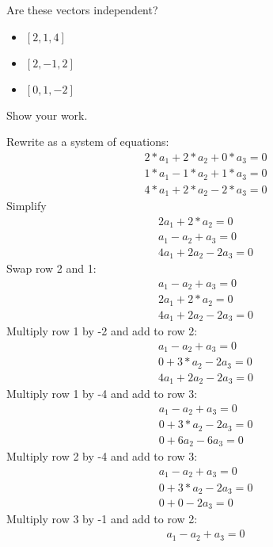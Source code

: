 \begin{Exercise}[title={Vector Independence}, label=vector_independence]
    Are these vectors independent? 
    \begin{itemize}
    	\item $[2, 1, 4]$
    	\item $[2, -1, 2]$ 
    	\item $[0, 1, -2]$
    \end{itemize}
    Show your work.
\end{Exercise}
\begin{Answer}[ref=vector_independence]
    Rewrite as a system of equations:
        $$\begin{matrix}
			2*a_1 +2*a_2 + 0*a_3 = 0 \\
			1*a_1 - 1*a_2 +1*a_3 = 0 \\
			4*a_1 + 2*a_2 - 2*a_3 = 0
		  \end{matrix} $$
	Simplify
		$$\begin{matrix}
			2a_1 +2*a_2  = 0 \\
			a_1 - a_2 + a_3 = 0 \\
			4a_1 + 2a_2 - 2a_3 = 0
		  \end{matrix} $$
	Swap row 2 and 1:
		$$\begin{matrix}
			a_1 - a_2 + a_3 = 0 \\
			2a_1 +2*a_2  = 0 \\
			4a_1 + 2a_2 - 2a_3 = 0
		  \end{matrix} $$
	Multiply row 1 by -2 and add to row 2:
	   $$\begin{matrix}
			a_1 - a_2 + a_3 = 0 \\
			0 +  3*a_2 -2a_3    = 0 \\
			4a_1 + 2a_2 - 2a_3 = 0
		  \end{matrix} $$
	Multiply row 1 by -4 and add to row 3:	
	    $$\begin{matrix}
			a_1 - a_2 + a_3 = 0 \\
			0 +   3*a_2 -2a_3    = 0 \\
			0   + 6a_2 - 6a_3 = 0
		  \end{matrix} $$
	Multiply row 2 by -4 and add to row 3:
	   $$\begin{matrix}
			a_1 - a_2 + a_3 = 0 \\
			0 +   3*a_2 -2a_3    = 0 \\
			0   + 0   - 2a_3 = 0
		  \end{matrix} $$
	Multiply row 3 by -1 and add to row 2:
		$$\begin{matrix}
			a_1 - a_2 + a_3 = 0 \\

\end{matrix}$$
\end{Answer}
